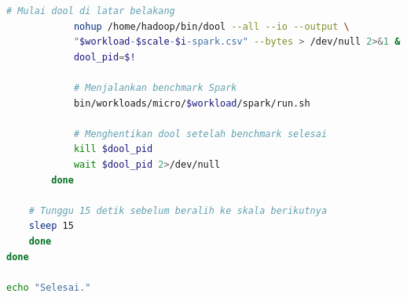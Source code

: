 \begin{lstlisting}[language=bash]
            # Mulai dool di latar belakang
            nohup /home/hadoop/bin/dool --all --io --output \
            "$workload-$scale-$i-spark.csv" --bytes > /dev/null 2>&1 &
            dool_pid=$!

            # Menjalankan benchmark Spark
            bin/workloads/micro/$workload/spark/run.sh

            # Menghentikan dool setelah benchmark selesai
            kill $dool_pid
            wait $dool_pid 2>/dev/null
        done

	# Tunggu 15 detik sebelum beralih ke skala berikutnya
	sleep 15
    done
done

echo "Selesai."
\end{lstlisting}

